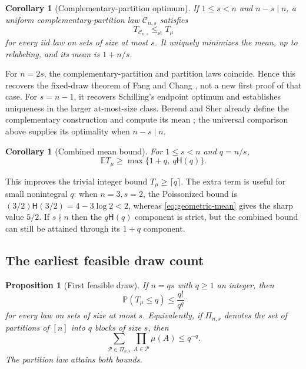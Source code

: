\documentclass[11pt]{article}
\numberwithin{equation}{section}
\newtheorem{proposition}[theorem]{Proposition}
\newtheorem{corollary}[theorem]{Corollary}
\theoremstyle{remark}
\newcommand{\Pp}{\mathbb P}
\newcommand{\E}{\mathbb E}
\newcommand{\1}{\mathbf 1}
\newcommand{\st}{\leq_{\mathrm{st}}}
\newcommand{\hreal}{\mathsf H}
\begin{document}
\begin{corollary}[Complementary-partition optimum]\label{cor:complement}
If $1\leq s<n$ and $n-s\mid n$, a uniform complementary-partition law $\mathcal C_{n,s}$ satisfies
\[
 T_{\mathcal C_{n,s}}\st T_\mu
\]
for every iid law on sets of size at most $s$. It uniquely minimizes the mean, up to relabeling, and its mean is $1+n/s$.
\end{corollary}

For $n=2s$, the complementary-partition and partition laws coincide. Hence this recovers the fixed-draw theorem of Fang and Chang \cite[Theorem~2]{FangChang}, not a new first proof of that case. For $s=n-1$, it recovers Schilling's endpoint optimum \cite{Schilling} and establishes uniqueness in the larger at-most-size class. Berend and Sher already define the complementary construction and compute its mean \cite[Section~2, equation~(2)]{BerendSher}; the universal comparison above supplies its optimality when $n-s\mid n$.

\begin{corollary}[Combined mean bound]\label{cor:combined}
For $1\leq s<n$ and $q=n/s$,
\begin{equation}\label{eq:combined}
 \E T_\mu\geq\max\{1+q,\ q\hreal(q)\}.
\end{equation}
\end{corollary}

This improves the trivial integer bound $T_\mu\geq\lceil q\rceil$. The extra term is useful for small nonintegral $q$: when $n=3,s=2$, the Poissonized bound is $(3/2)\hreal(3/2)=4-3\log2<2$, whereas \eqref{eq:geometric-mean} gives the sharp value $5/2$. If $s\nmid n$ then the $q\hreal(q)$ component is strict, but the combined bound can still be attained through its $1+q$ component.

\subsection{The earliest feasible draw count}

\begin{proposition}[First feasible draw]\label{prop:first-draw}
If $n=qs$ with $q\geq1$ an integer, then
\begin{equation}\label{eq:first-draw}
 \Pp(T_\mu\leq q)\leq\frac{q!}{q^q}
\end{equation}
for every law on sets of size at most $s$. Equivalently, if $\Pi_{n,s}$ denotes the set of partitions of $[n]$ into $q$ blocks of size $s$, then
\begin{equation}\label{eq:partition-lagrangian}
 \sum_{\mathcal P\in\Pi_{n,s}}\prod_{A\in\mathcal P}\mu(A)
 \leq q^{-q}.
\end{equation}
The partition law attains both bounds.
\end{proposition}
\end{document}

